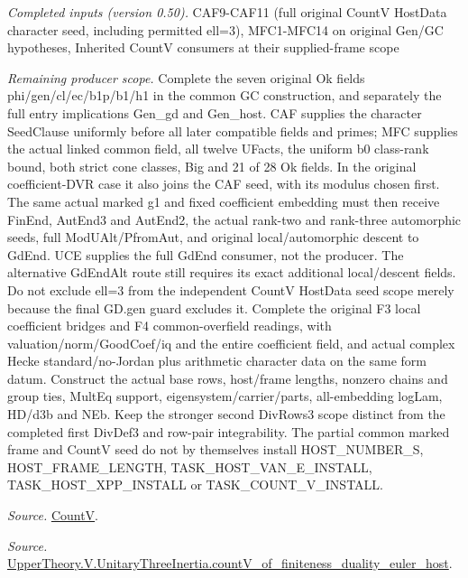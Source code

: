 \documentclass[11pt,a4paper]{article}
\numberwithin{equation}{section}
\theoremstyle{remark}\newtheorem{remark}[theorem]{Remark}
\begin{document}
\emph{Completed inputs (version 0.50).} CAF9-CAF11 (full original CountV HostData character seed, including permitted ell=3), MFC1-MFC14 on original Gen/GC hypotheses, Inherited CountV consumers at their supplied-frame scope

\emph{Remaining producer scope.} Complete the seven original Ok fields phi/gen/cl/ec/b1p/b1/h1 in the common GC construction, and separately the full entry implications Gen\_\allowbreak gd and Gen\_\allowbreak host. CAF supplies the character SeedClause uniformly before all later compatible fields and primes; MFC supplies the actual linked common field, all twelve UFacts, the uniform b0 class-rank bound, both strict cone classes, Big and 21 of 28 Ok fields. In the original coefficient-DVR case it also joins the CAF seed, with its modulus chosen first. The same actual marked g1 and fixed coefficient embedding must then receive FinEnd, AutEnd3 and AutEnd2, the actual rank-two and rank-three automorphic seeds, full ModUAlt/PfromAut, and original local/automorphic descent to GdEnd. UCE supplies the full GdEnd consumer, not the producer. The alternative GdEndAlt route still requires its exact additional local/descent fields. Do not exclude ell=3 from the independent CountV HostData seed scope merely because the final GD.gen guard excludes it. Complete the original F3 local coefficient bridges and F4 common-overfield readings, with valuation/norm/GoodCoef/iq and the entire coefficient field, and actual complex Hecke standard/no-Jordan plus arithmetic character data on the same form datum. Construct the actual base rows, host/frame lengths, nonzero chains and group ties, MultEq support, eigensystem/carrier/parts, all-embedding logLam, HD/d3b and NEb. Keep the stronger second DivRows3 scope distinct from the completed first DivDef3 and row-pair integrability. The partial common marked frame and CountV seed do not by themselves install HOST\_\allowbreak NUMBER\_\allowbreak S, HOST\_\allowbreak FRAME\_\allowbreak LENGTH, TASK\_\allowbreak HOST\_\allowbreak VAN\_\allowbreak E\_\allowbreak INSTALL, TASK\_\allowbreak HOST\_\allowbreak XPP\_\allowbreak INSTALL or TASK\_\allowbreak COUNT\_\allowbreak V\_\allowbreak INSTALL.

\emph{Source.} \href{https://github.com/CocoSgt/riemann-hypothesis-lean/blob/7cbf7a0c32fca1badf05931879a37c3f8a2b03b4/src/Development/AutomorphicArithmetic/AutomorphicVarieties/HeightAndVanishing/Counts.lean#L69-L69}{CountV}.

\emph{Source.} \href{https://github.com/CocoSgt/riemann-hypothesis-lean/blob/7cbf7a0c32fca1badf05931879a37c3f8a2b03b4/src/Development/AutomorphicArithmetic/AutomorphicVarieties/ModularityArgument/ThresholdArguments/DenseThresholdCases/CountVOf.lean#L33-L60}{UpperTheory.V.UnitaryThreeInertia.countV\_\allowbreak of\_\allowbreak finiteness\_\allowbreak duality\_\allowbreak euler\_\allowbreak host}.
\end{document}
